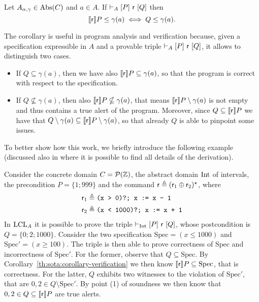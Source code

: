 \begin{corollary}\label{th:sota:corollary-verification}
	Let $A_{\alpha, \gamma} \in \text{\normalfont Abs}(C)$ and $a \in A$. If $\vdash_{A}\nobreak[P]~\mathsf{r}~[Q]$ then
	\[
	\llbracket\mathsf{r}\rrbracket P \le \gamma(a) \iff Q \le \gamma(a) .
	\]
\end{corollary}
The corollary is useful in program analysis and verification because, given a specification expressible in $A$ and a provable triple $\vdash_{A}\nobreak[P]~\mathsf{r}~[Q]$, it allows to distinguish two cases.
\begin{itemize}
	\item If $Q \subseteq \gamma(a)$, then we have also $\llbracket\mathsf{r}\rrbracket P \subseteq \gamma(a)$, so that the program is correct with respect to the specification.
	\item If $Q \nsubseteq \gamma(a)$, then also $\llbracket\mathsf{r}\rrbracket P \nsubseteq \gamma(a)$, that means $\llbracket\mathsf{r}\rrbracket P \setminus \gamma(a)$ is not empty and thus contains a true alert of the program. Moreover, since $Q \subseteq \llbracket\mathsf{r}\rrbracket P$ we have that $Q \setminus \gamma(a) \subseteq \llbracket\mathsf{r}\rrbracket P \setminus \gamma(a)$, so that already $Q$ is able to pinpoint some issues.
\end{itemize}
To better show how this work, we briefly introduce the following example (discussed also in \cite{BGGR21} where it is possible to find all details of the derivation).
\begin{example}
	Consider the concrete domain $C = \mathcal{P}(\mathbb{Z})$, the abstract domain $\text{Int}$ of intervals, the precondition $P = \{ 1; 999 \}$ and the command $\mathsf{r} \triangleq (\mathsf{r}_1 \oplus \mathsf{r}_2)^{\star}$, where
	\begin{align*}
		\mathsf{r}_1 &\triangleq \texttt{(x > 0)?; x := x - 1} \\
		\mathsf{r}_2 &\triangleq \texttt{(x < 1000)?; x := x + 1}
	\end{align*}
	In $\text{LCL}_A$ it is possible to prove the triple $\vdash_{\text{Int}}\nobreak[P]~\mathsf{r}~[Q]$, whose postcondition is $Q = \{ 0; 2; 1000 \}$. Consider the two specification $\text{Spec}= (x \le 1000)$ and $\text{Spec}' = (x \ge 100)$.
	The triple is then able to prove correctness of $\text{Spec}$ and incorrectness of $\text{Spec}'$.
	For the former, observe that $Q \subseteq \text{Spec}$. By Corollary~\ref{th:sota:corollary-verification} we then know $\llbracket\mathsf{r}\rrbracket P \subseteq \text{Spec}$, that is correctness.
	For the latter, $Q$ exhibits two witnesses to the violation of $\text{Spec}'$, that are $0, 2 \in Q \setminus \text{Spec}'$. By point (1) of soundness we then know that $0, 2 \in Q \subseteq \llbracket\mathsf{r}\rrbracket P$ are true alerts.
\end{example}

